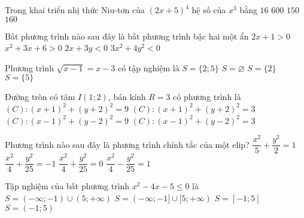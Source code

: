 \begin{ex}%
	Trong khai triển nhị thức Niu-tơn của $(2x+5)^4$ hệ số của $x^3$ bằng
	\choice
	{$16$}
	{$600$}
	{$150$}
	{\True $160$}
\end{ex}
\begin{ex}%
	Bất phương trình nào sau đây là bất phương trình bậc hai một ẩn
	\choice
	{$2 x+1>0$}
	{\True $x^2+3 x+6>0$}
	{$2 x+3 y<0$}
	{$3 x^2+4 y^2<0$}
\end{ex}
\begin{ex}%
	Phương trình $\sqrt{x-1}=x-3$ có tập nghiệm là
	\choice
	{$S=\{2 ; 5\}$}
	{$S=\varnothing$}
	{$S=\{2\}$}
	{\True $S=\{5\}$}
\end{ex}
\begin{ex}%
	Đường tròn có tâm $I(1 ; 2)$, bán kính $R=3$ có phương trình là
	\choice
	{$(C)\colon (x+1)^2+(y+2)^2=9$}
	{$(C)\colon (x+1)^2+(y+2)^2=3$}
	{\True $(C)\colon (x-1)^2+(y-2)^2=9$}
	{$(C)\colon (x-1)^2+(y-2)^2=3$}
\end{ex}
\begin{ex}%
	Phương trình nào sau đây là phương trình chính tắc của một elip?
	\choice
	{\True $\dfrac{x^2}{5}+\dfrac{y^2}{2}=1$}
	{$\dfrac{x^2}{4}+\dfrac{y^2}{25}=-1$}
	{$\dfrac{x^2}{4}+\dfrac{y^2}{25}=0$}
	{$\dfrac{x^2}{4}-\dfrac{y^2}{25}=1$}
\end{ex}
\begin{ex}%
	Tập nghiệm của bất phương trình $x^2-4 x-5 \leq 0$ là
	\choice
	{$S=(-\infty ;-1) \cup(5 ;+\infty)$}
	{$S=(-\infty ;-1] \cup[5 ;+\infty)$}
	{\True $S=[-1 ; 5]$}
	{$S=(-1 ; 5)$}
\end{ex}


